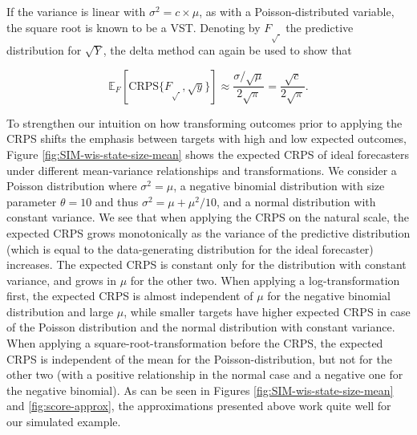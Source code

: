 \documentclass{article}
\begin{document}
If the variance is linear with $\sigma^2 = c \times \mu$, as with a Poisson-distributed variable, the square root is known to be a VST. 
Denoting by $F_{\sqrt{\ }}$ the predictive distribution for $\sqrt{Y}$, the delta method can again be used to show that
\begin{linenomath*}
\begin{equation}
\mathbb{E}_F[\text{CRPS}\{F_{\sqrt{\ }}, \sqrt{y}\}] \approx \frac{\sigma/\sqrt{\mu}}{2\sqrt{\pi}} = \frac{\sqrt{c}}{2\sqrt{\pi}}
.
\end{equation}
\end{linenomath*}

To strengthen our intuition on how transforming outcomes prior to applying the CRPS shifts the emphasis between targets with high and low expected outcomes, Figure \ref{fig:SIM-wis-state-size-mean} shows the expected CRPS of ideal forecasters under different mean-variance relationships and transformations. We consider a Poisson distribution where $\sigma^2 = \mu$, a negative binomial distribution with size parameter $\theta = 10$ and thus $\sigma^2 = \mu + \mu^2/10$, and a normal distribution with constant variance. We see that when applying the CRPS on the natural scale, the expected CRPS grows monotonically as the variance of the predictive distribution (which is equal to the data-generating distribution for the ideal forecaster) increases. The expected CRPS is constant only for the distribution with constant variance, and grows in $\mu$ for the other two. When applying a log-transformation first, the expected CRPS is almost independent of $\mu$ for the negative binomial distribution and large $\mu$, while smaller targets have higher expected CRPS in case of the Poisson distribution and the normal distribution with constant variance. When applying a square-root-transformation before the CRPS, the expected CRPS is independent of the mean for the Poisson-distribution, but not for the other two (with a positive relationship in the normal case and a negative one for the negative binomial). As can be seen in Figures \ref{fig:SIM-wis-state-size-mean} and \ref{fig:score-approx}, the approximations presented above work quite well for our simulated example. 
\end{document}
